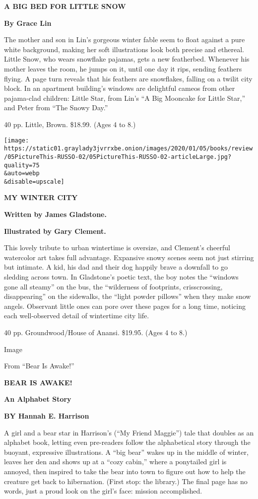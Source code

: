 \textbf{A BIG BED FOR LITTLE SNOW}

\textbf{By Grace Lin}

The mother and son in Lin's gorgeous winter fable seem to float against
a pure white background, making her soft illustrations look both precise
and ethereal. Little Snow, who wears snowflake pajamas, gets a new
featherbed. Whenever his mother leaves the room, he jumps on it, until
one day it rips, sending feathers flying. A page turn reveals that his
feathers are snowflakes, falling on a twilit city block. In an apartment
building's windows are delightful cameos from other pajama-clad
children: Little Star, from Lin's ``A Big Mooncake for Little Star,''
and Peter from ``The Snowy Day.''

40 pp. Little, Brown. \$18.99. (Ages 4 to 8.)

\texttt{[image: https://static01.graylady3jvrrxbe.onion/images/2020/01/05/books/review/05PictureThis-RUSSO-02/05PictureThis-RUSSO-02-articleLarge.jpg?quality=75\\\&auto=webp\\\&disable=upscale]}

\textbf{MY WINTER CITY}

\textbf{Written by James Gladstone.}

\textbf{Illustrated by Gary Clement.}

This lovely tribute to urban wintertime is oversize, and Clement's
cheerful watercolor art takes full advantage. Expansive snowy scenes
seem not just stirring but intimate. A kid, his dad and their dog
happily brave a downfall to go sledding across town. In Gladstone's
poetic text, the boy notes the ``windows gone all steamy'' on the bus,
the ``wilderness of footprints, crisscrossing, disappearing'' on the
sidewalks, the ``light powder pillows'' when they make snow angels.
Observant little ones can pore over these pages for a long time,
noticing each well-observed detail of wintertime city life.

40 pp. Groundwood/House of Anansi. \$19.95. (Ages 4 to 8.)

Image

From ``Bear Is Awake!''

\textbf{BEAR IS AWAKE!}

\textbf{An Alphabet Story}

\textbf{BY Hannah E. Harrison}

A girl and a bear star in Harrison's (``My Friend Maggie'') tale that
doubles as an alphabet book, letting even pre-readers follow the
alphabetical story through the buoyant, expressive illustrations. A
``big bear'' wakes up in the middle of winter, leaves her den and shows
up at a ``cozy cabin,'' where a ponytailed girl is annoyed, then
inspired to take the bear into town to figure out how to help the
creature get back to hibernation. (First stop: the library.) The final
page has no words, just a proud look on the girl's face: mission
accomplished.

